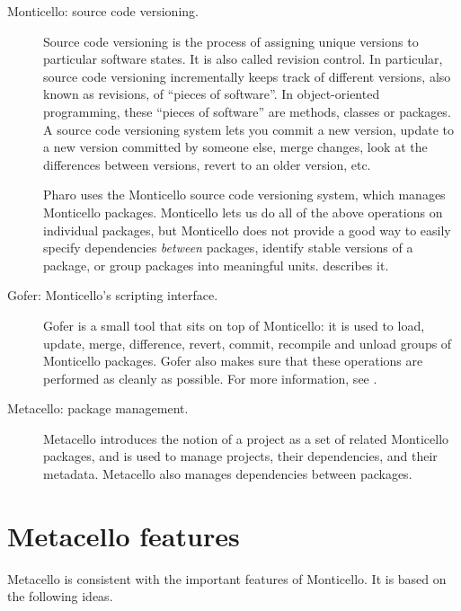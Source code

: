 \documentclass[a4paper,10pt,twoside]{book}
\begin{document}
\begin{description}

\item[Monticello: source code versioning.]
Source code versioning is the process of assigning unique versions to particular software states.  It is also called revision control.  
In particular, source code versioning incrementally keeps track of different versions, also known as revisions, of ``pieces of software''. 
In object-oriented programming, these ``pieces of software'' are methods, classes or packages. A source code versioning system lets you commit a new version, update to a new version committed by someone else, merge changes, look at the differences between versions,  revert to an older version, etc. 

Pharo uses the Monticello source code versioning system, which manages Monticello packages.  Monticello lets us do all of the above operations on individual packages, but Monticello does not provide a good way to easily specify dependencies \emph{between} packages, identify stable versions of a package, or group packages into meaningful units.  describes it. 

\item[Gofer: Monticello's scripting interface.]
Gofer is a small tool that sits on top of Monticello: it is used to load, update, merge, difference, revert, commit, recompile and unload groups of Monticello packages. Gofer also makes sure that these operations are performed as cleanly as possible. 
For more information, see .



\item[Metacello: package management.] Metacello introduces the notion of a project as a set of related Monticello packages, and is used to manage projects,   their dependencies, and their metadata. 
Metacello also manages dependencies between packages.
\end{description}




\section{Metacello features}

Metacello is consistent with the important features of Monticello. It is based on the following ideas.
\end{document}
